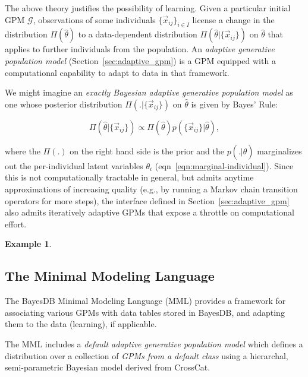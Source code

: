 \documentclass[10pt,letterpaper]{article}
\newtheorem{example}{Example}[section]
\begin{document}
The above theory justifies the possibility of learning.  Given a
particular initial GPM $\mathcal{G}$, observations of some individuals
$\{\vec{x}_{ij}\}_{i \in I}$ license a change in the distribution
$\Pi(\hat\theta)$ to a data-dependent distribution
$\Pi(\hat\theta|\{\vec{x}_{ij}\})$ on $\hat\theta$ that applies to
further individuals from the population.  An \emph{adaptive generative
  population model} (Section~\ref{sec:adaptive_gpm}) is a GPM equipped
with a computational capability to adapt to data in that framework.

We might imagine an \emph{exactly Bayesian adaptive generative population model}
as one whose posterior distribution $\Pi(.|\{\vec{x}_{ij}\})$ on
$\hat\theta$ is given by Bayes' Rule:

\[ \Pi(\hat\theta|\{\vec{x}_{ij}\}) \propto \Pi(\hat\theta) p(\{\vec{x}_{ij}\}|\hat\theta), \]

where the $\Pi(.)$ on the right hand side is the prior and the $p(.|\hat\theta)$
marginalizes out the per-individual latent variables $\theta_i$ (eqn~\ref{eqn:marginal-individual}).
Since this is not computationally tractable in general, but admits
anytime approximations of increasing quality (e.g., by running a Markov chain
transition operators for more steps), the
interface defined in Section~\ref{sec:adaptive_gpm} also admits
iteratively adaptive GPMs that expose a throttle on computational
effort.

\begin{example}
\end{example}

\subsection{The Minimal Modeling Language}

The BayesDB Minimal Modeling Language (MML) provides a framework for
associating various GPMs with data tables stored in BayesDB, and
adapting them to the data (learning), if applicable.

The MML includes a \textit{default adaptive generative population
  model} which defines a distribution over a collection of
\textit{GPMs from a default class} using a hierarchal, semi-parametric
Bayesian model derived from CrossCat.
\end{document}
